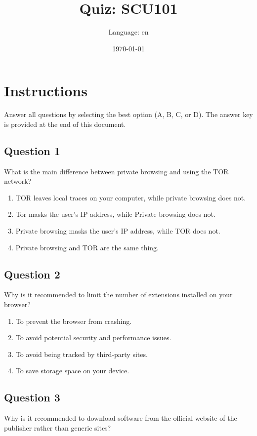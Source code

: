 \documentclass[12pt,a4paper]{article}
\title{Quiz: SCU101}
\author{Language: en}
\date{\today}
\begin{document}
\maketitle
\thispagestyle{fancy}

\section*{Instructions}
Answer all questions by selecting the best option (A, B, C, or D). The answer key is provided at the end of this document.

\bigskip


\subsection*{Question 1}
What is the main difference between private browsing and using the TOR network?

\begin{enumerate}[label=\Alph*., leftmargin=*]
\item TOR leaves local traces on your computer, while private browsing does not.
\item Tor masks the user's IP address, while Private browsing does not.
\item Private browsing masks the user's IP address, while TOR does not.
\item Private browsing and TOR are the same thing.
\end{enumerate}

\bigskip


\subsection*{Question 2}
Why is it recommended to limit the number of extensions installed on your browser?

\begin{enumerate}[label=\Alph*., leftmargin=*]
\item To prevent the browser from crashing.
\item To avoid potential security and performance issues.
\item To avoid being tracked by third-party sites.
\item To save storage space on your device.
\end{enumerate}

\bigskip


\subsection*{Question 3}
Why is it recommended to download software from the official website of the publisher rather than generic sites?
\end{document}
